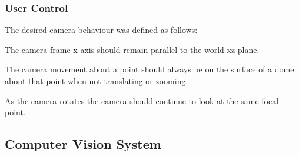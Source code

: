 \subsubsection{User Control}

The desired camera behaviour was defined as follows:

\begin{compactitem}
	\item The camera frame x-axis should remain parallel to the world xz plane.
	\item The camera movement about a point should always be on the surface of a dome about that point when not translating or zooming.
	\item As the camera rotates the camera should continue to look at the same focal point.
\end{compactitem}


\subsection{Computer Vision System} \label{sec:Computer Vision System}

